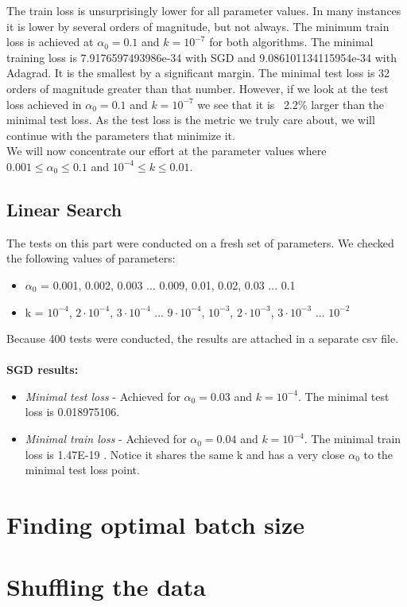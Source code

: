\documentclass[12pt]{scrartcl}
\begin{document}
The train loss is unsurprisingly lower for all parameter values. In many instances it is lower by several orders of magnitude, but not always. The minimum train loss is achieved at $\alpha_0=0.1$ and $k=10^{-7}$ for both algorithms. The minimal training loss is 7.9176597493986e-34 with SGD and 9.086101134115954e-34 with Adagrad. It is the smallest by a significant margin. The minimal test loss is 32 orders of magnitude greater than that number. However, if we look at the test loss achieved in $\alpha_0=0.1$ and $k=10^{-7}$ we see that it is ~2.2\% larger than the minimal test loss. As the test loss is the metric we truly care about, we will continue with the parameters that minimize it.\\

We will now concentrate our effort at the parameter values where $0.001 \leq \alpha_0 \leq 0.1$ and $10^{-4} \leq k \leq 0.01$.

\subsection{Linear Search}
The tests on this part were conducted on a fresh set of parameters. We checked the following values of parameters:
\begin{itemize}
\item $\alpha_0$ = 0.001, 0.002, 0.003 ... 0.009, 0.01, 0.02, 0.03 ... 0.1
\item k = $10^{-4}$, $2 \cdot 10^{-4}$, $3 \cdot 10^{-4}$ ... $9 \cdot 10^{-4}$, $10^{-3}$, $2 \cdot 10^{-3}$, $3 \cdot 10^{-3}$ ... $10^{-2}$
\end{itemize}

Because 400 tests were conducted, the results are attached in a separate csv file.\\\\
\textbf{SGD results:}
\begin{itemize}
\item \textit{Minimal test loss} - Achieved for $\alpha_0 = 0.03$ and $k=10^{-4}$. The minimal test loss is 0.018975106.
\item \textit{Minimal train loss} - Achieved for $\alpha_0 = 0.04$ and $k=10^{-4}$. The minimal train loss is 1.47E-19
. Notice it shares the same k and has a very close $\alpha_0$ to the minimal test loss point.
\end{itemize}

\section{Finding optimal batch size}

\section{Shuffling the data}
\end{document}
